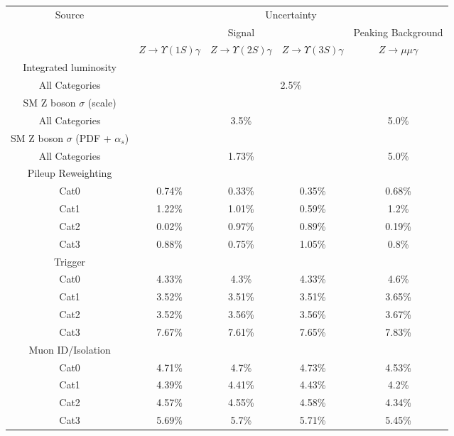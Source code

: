 
\begin{tabular}{c|c|c|c|c}
\cline{1-5}
\multirow{3}{*}{Source} & \multicolumn{4}{c}{Uncertainty} \\
\cline{2-5}
& \multicolumn{3}{c|}{Signal} & Peaking Background   \\
\cline{2-5}
& $Z \rightarrow \Upsilon(1S)  \gamma$ & $Z \rightarrow \Upsilon(2S)  \gamma$ & $Z \rightarrow \Upsilon(3S)  \gamma$ & $Z \rightarrow \mu\mu\gamma$  \\
\hline\hline
Integrated luminosity & \multicolumn{4}{l}{} \\ \hline
All Categories & \multicolumn{4}{c}{2.5\%} \\
\hline\hline
SM Z boson $\sigma$ (scale) & \multicolumn{4}{l}{} \\ \hline
All Categories & \multicolumn{3}{c|}{3.5\%}  & \multicolumn{1}{c}{5.0\%} \\
\hline\hline
SM Z boson $\sigma$ (PDF + $\alpha_s$)  & \multicolumn{4}{l}{} \\ \hline
All Categories & \multicolumn{3}{c|}{1.73\%}  & \multicolumn{1}{c}{5.0\%} \\
\hline\hline
Pileup Reweighting  & \multicolumn{4}{l}{} \\ \hline
Cat0 & 0.74\% & 0.33\% & 0.35\% & 0.68\% \\
Cat1 & 1.22\% & 1.01\% & 0.59\% & 1.2\% \\
Cat2 & 0.02\% & 0.97\% & 0.89\% & 0.19\% \\
Cat3 & 0.88\% & 0.75\% & 1.05\% & 0.8\% \\
\hline\hline
Trigger  & \multicolumn{4}{l}{} \\ \hline
Cat0 & 4.33\% & 4.3\% & 4.33\% & 4.6\% \\
Cat1 & 3.52\% & 3.51\% & 3.51\% & 3.65\% \\
Cat2 & 3.52\% & 3.56\% & 3.56\% & 3.67\% \\
Cat3 & 7.67\% & 7.61\% & 7.65\% & 7.83\% \\
\hline\hline
Muon ID/Isolation & \multicolumn{4}{l}{} \\ \hline
Cat0 & 4.71\% & 4.7\% & 4.73\% & 4.53\% \\
Cat1 & 4.39\% & 4.41\% & 4.43\% & 4.2\% \\
Cat2 & 4.57\% & 4.55\% & 4.58\% & 4.34\% \\
Cat3 & 5.69\% & 5.7\% & 5.71\% & 5.45\% \\

\end{tabular}
